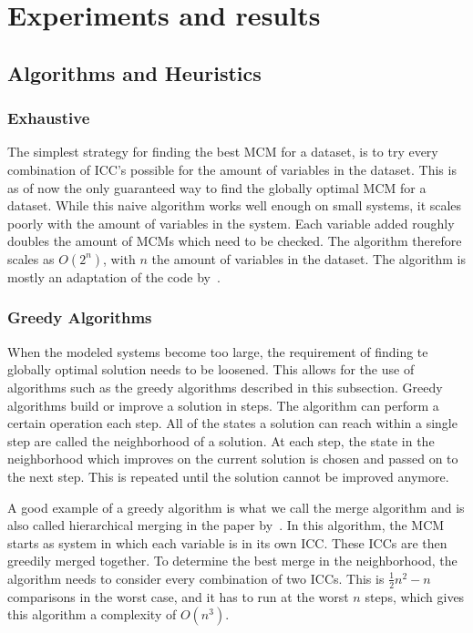 \chapter{Experiments and results}\label{AER}

\section{Algorithms and Heuristics}

\subsection{Exhaustive}
The simplest strategy for finding the best MCM for a dataset, is to try every combination of ICC's possible for the amount of variables in the dataset. This is as of now the only guaranteed way to find the globally optimal MCM for a dataset. While this naive algorithm works well enough on small systems, it scales poorly with the amount of variables in the system. Each variable added roughly doubles the amount of MCMs which need to be checked. The algorithm therefore scales as \(O(2^n)\), with \(n\) the amount of variables in the dataset. The algorithm is mostly an adaptation of the code by~\citet{bayesianinference}.

\subsection{Greedy Algorithms}
When the modeled systems become too large, the requirement of finding te globally optimal solution needs to be loosened. This allows for the use of algorithms such as the greedy algorithms described in this subsection. Greedy algorithms build or improve a solution in steps. The algorithm can perform a certain operation each step. All of the states a solution can reach within a single step are called the neighborhood of a solution. At each step, the state in the neighborhood which improves on the current solution is chosen and passed on to the next step. This is repeated until the solution cannot be improved anymore.

A good example of a greedy algorithm is what we call the merge algorithm and is also called hierarchical merging in the paper by~\citet{bayesianinference}. In this algorithm, the MCM starts as system in which each variable is in its own ICC. These ICCs are then greedily merged together. To determine the best merge in the neighborhood, the algorithm needs to consider every combination of two ICCs. This is \(\frac{1}{2}n^2 - n\) comparisons in the worst case, and it has to run at the worst \(n\) steps, which gives this algorithm a complexity of \(O(n^3)\).


